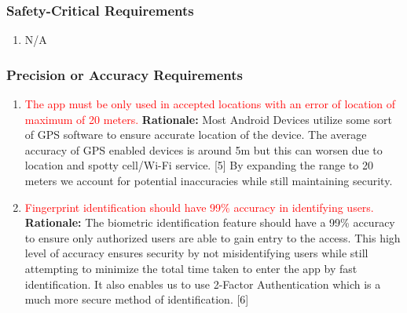 \documentclass[]{article}
\begin{document}
\subsubsection{Safety-Critical Requirements}
\label{ssub:safety_critical_requirements}
\begin{enumerate}[{PR-SC}1. ]
	\item N/A
\end{enumerate}

\subsubsection{Precision or Accuracy Requirements}
\label{ssub:precision_or_accuracy_requirements}
\begin{enumerate}[{PR-PA}1. ]
	\item \textcolor{red}{The app must be only used in accepted locations with an error of location of maximum of 20 meters. }\newline
	      \textbf{Rationale:} Most Android Devices utilize some sort of GPS software to ensure accurate location of the device. The average accuracy of GPS enabled devices is around 5m but this can worsen due to location and spotty cell/Wi-Fi service. [5] By expanding the range to 20 meters we account for potential inaccuracies while still maintaining security.

	\item \textcolor{red}{Fingerprint identification should have 99\% accuracy in identifying users.}\newline
	      \textbf{Rationale:} The biometric identification feature should have a 99\% accuracy to ensure only authorized users are able to gain entry to the access. This high level of accuracy ensures security by not misidentifying users while still attempting to minimize the total time taken to enter the app by fast identification. It also enables us to use 2-Factor Authentication which is a much more secure method of identification. [6]

\end{enumerate}
\end{document}
